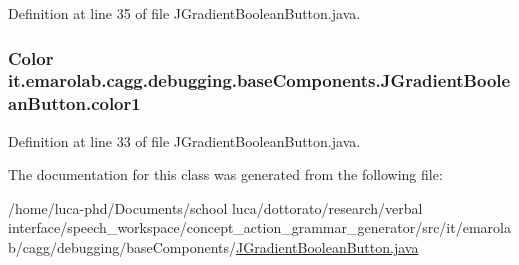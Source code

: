 Definition at line 35 of file J\-Gradient\-Boolean\-Button.\-java.

\hypertarget{classit_1_1emarolab_1_1cagg_1_1debugging_1_1baseComponents_1_1JGradientBooleanButton_a022be1289b6928205143a1e186e4ac69}{
\subsubsection[{color1}]{\setlength{\rightskip}{0pt plus 5cm}Color it.\-emarolab.\-cagg.\-debugging.\-base\-Components.\-J\-Gradient\-Boolean\-Button.\-color1\hspace{0.3cm}{\ttfamily [private]}}}\label{classit_1_1emarolab_1_1cagg_1_1debugging_1_1baseComponents_1_1JGradientBooleanButton_a022be1289b6928205143a1e186e4ac69}


Definition at line 33 of file J\-Gradient\-Boolean\-Button.\-java.



The documentation for this class was generated from the following file\-:\begin{DoxyCompactItemize}
\item 
/home/luca-\/phd/\-Documents/school luca/dottorato/research/verbal interface/speech\-\_\-workspace/concept\-\_\-action\-\_\-grammar\-\_\-generator/src/it/emarolab/cagg/debugging/base\-Components/\hyperlink{JGradientBooleanButton_8java}{J\-Gradient\-Boolean\-Button.\-java}\end{DoxyCompactItemize}
